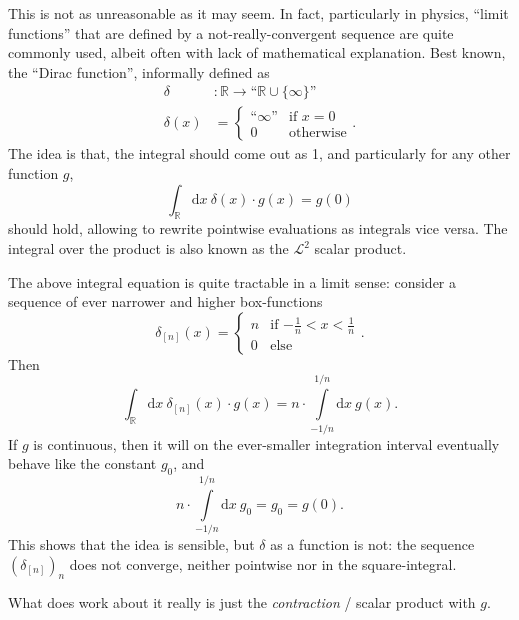 \documentclass[final,sigplan]{acmart}\settopmatter{printfolios=true,printccs=false,printacmref=false}
\theoremstyle{acmplain}
\theoremstyle{acmdefinition}
\begin{document}
This is not as unreasonable as it may seem. In fact, particularly in physics, “limit functions” that are defined by a not-really-convergent sequence are quite commonly used, albeit often with lack of mathematical explanation. Best known, the “Dirac function”, informally defined as
\begin{align*}
  \delta &\colon \mathbb{R} \to “\mathbb{R}\cup\{\infty\}”
 \\
  \delta(x) &= \begin{cases} “\infty” & \text{if }x=0
                          \\ 0        & \text{otherwise} \end{cases}.
\end{align*}
The idea is that, the integral should come out as 1, and particularly for any other function $g$,
\[
  \int_\mathbb{R}\!\mathrm{d}x\: \delta(x)\cdot g(x) = g(0)
\]
should hold, allowing to rewrite pointwise evaluations as integrals vice versa. The integral over the product is also known as the $\mathcal{L}^2$ scalar product.

The above integral equation is quite tractable in a limit sense: consider a sequence of ever narrower and higher box-functions
\[
  \delta_{[n]}(x) = \begin{cases}
                           n   & \text{if $-\tfrac1n<x<\tfrac1n$}
                        \\ 0   & \text{else}
                       \end{cases}.
\]
Then
\[
  \int_\mathbb{R}\!\mathrm{d}x\: \delta_{[n]}(x)\cdot g(x)
    = n\cdot\int\limits_{-1/n}^{1/n}\mathrm{d}x\: g(x).
\]
If $g$ is continuous, then it will on the ever-smaller integration interval eventually behave like the constant $g_0$, and
\[
  n\cdot\int\limits_{-1/n}^{1/n}\mathrm{d}x\: g_0 = g_0 = g(0).
\]
This shows that the idea is sensible, but $\delta$ as a function is not: the sequence $(\delta_{[n]})_n$ does not converge, neither pointwise nor in the square-integral.

What does work about it really is just the \emph{contraction} / scalar product with $g$. 
\end{document}
